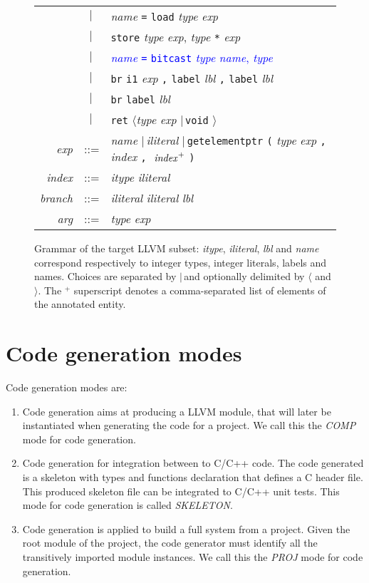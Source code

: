 \documentclass{llncs}
\newcommand{\llvm}[1]{\texttt{#1}}
\newcommand{\lalt}[0]{$\langle$\xspace}
\newcommand{\ralt}[0]{$\rangle$\xspace}
\newcommand{\alt}[0]{$\mid\,$}
\newcommand{\ListOf}[1]{$\mbox{#1}^+$}
\newcommand{\nt}[1]{{\normalfont\textit{#1}}}
\begin{document}
\begin{figure}
\begin{center}
\begin{tabular}{rcl}
      & \alt & \nt{name} \llvm{=} \llvm{load} \nt{type} \nt{exp} \\
      & \alt & \llvm{store} \nt{type} \nt{exp}, \nt{type} \llvm{*} \nt{exp} \\
      & \alt & \textcolor{blue}{\nt{name} \llvm{=} \llvm{bitcast} \nt{type} \nt{name}, \nt{type} }\\
      & \alt & \llvm{br} \llvm{i1} \nt{exp} \llvm{,} \llvm{label} \nt{lbl} \llvm{,} \llvm{label} \nt{lbl} \\
      & \alt & \llvm{br} \llvm{label} \nt{lbl} \\
      & \alt & \llvm{ret} \lalt \nt{type} \nt{exp} \alt \llvm{void} \ralt \\
      \nt{exp} & ::= & \nt{name} \alt \nt{iliteral} \alt \llvm{getelementptr} \llvm{(} \nt{type} \nt{exp} \llvm{,} \nt{index} \llvm{,} \textcolor{blue}{\ListOf{ \nt{index}}}  \llvm{)} \\
      \nt{index} & ::= & \nt{itype} \nt{iliteral} \\
      \nt{branch} & ::= & \nt{iliteral} \nt{iliteral} \nt{lbl} \\
      \nt{arg} & ::= & \nt{type} \nt{exp}
    \end{tabular}
  \end{center}
  \caption{Grammar of the target LLVM subset: \nt{itype}, \nt{iliteral}, \nt{lbl}
    and \nt{name} correspond respectively to integer types, integer literals,
    labels and names. Choices are separated by \alt and optionally delimited by
    \lalt and \ralt.  The \ListOf{} superscript denotes a comma-separated list of
    elements of the annotated entity.}
  \label{fig:llvm-grammar}
\end{figure}

\section{Code generation modes}
\label{sec:overview}

Code generation modes are:
\begin{enumerate}
\item Code generation aims at producing a LLVM module,
  that will later be instantiated when generating the code for a project. We
  call this the \emph{COMP} mode for code generation.
\item Code generation for integration between to C/C++ code.
  The code generated is a skeleton with types and functions declaration 
  that defines a C header file. This produced skeleton file can be integrated to
  C/C++ unit tests. This mode for code generation is called \emph{SKELETON}.
  
\item Code generation is applied to build a full system from a project. Given
  the root module of the project, the code generator must identify all the
  transitively imported module instances. We call this the \emph{PROJ} mode for
  code generation.
\end{enumerate}
\end{document}
